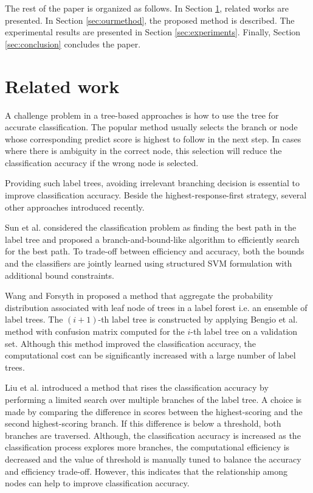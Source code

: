 \documentclass[review]{elsarticle}
\begin{document}
The rest of the paper is organized as follows. In Section \ref{sec:relatedwork}, related works are presented. In Section \ref{sec:ourmethod}, the proposed method is described. The experimental results are presented in Section \ref{sec:experiments}. Finally, Section \ref{sec:conclusion} concludes the paper.


\section{Related work} \label{sec:relatedwork}

A challenge problem in a tree-based approaches is how to use the tree for accurate classification. 
The popular method usually selects the branch or node whose corresponding predict score is highest to follow in the next step. 
In cases where there is ambiguity in the correct node, this selection will reduce the classification accuracy if the wrong node is selected. 

Providing such label trees, avoiding irrelevant branching decision is essential to improve classification accuracy. Beside the highest-response-first strategy, several other approaches introduced recently. 

Sun et al. \cite{SunICCV2013} considered the classification problem as finding the best path in the label tree and proposed a branch-and-bound-like algorithm to efficiently search for the best path. To trade-off between efficiency and accuracy, both the bounds and the classifiers are jointly learned using structured SVM formulation with additional bound constraints.

Wang and Forsyth in \cite{WangICME13} proposed a method that aggregate the probability distribution associated with leaf node of trees in a label forest i.e. an ensemble of label trees. The $(i+1)$-th label tree is constructed by applying Bengio et al. method \cite{Bengio.NIPS2010} with confusion matrix computed for the $i$-th label tree on a validation set. Although this method improved the classification accuracy, the computational cost can be significantly increased with a large number of label trees. 

Liu et al. \cite{Liu.CVPR2013.ProbTree} introduced a method that rises the classification accuracy by performing a limited search over multiple branches of the label tree. A choice is made by comparing the difference in scores between the highest-scoring and the second highest-scoring branch. If this difference is below a threshold, both branches are traversed. Although, the classification accuracy is increased as the classification process explores more branches, the computational efficiency is decreased and the value of threshold is manually tuned to balance the accuracy and efficiency trade-off. However, this indicates that the relationship among nodes can help to improve classification accuracy. 
\end{document}
